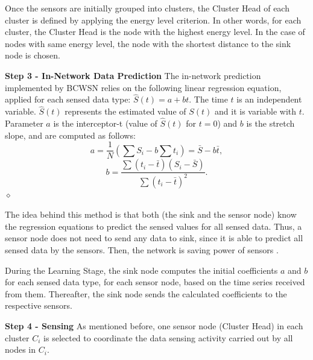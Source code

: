 \documentclass{acm_proc_article-sp}
\newcommand{\dia}{\hspace*{.1cm} \hfill $\diamond$}
\begin{document}
Once the sensors are initially grouped into clusters, the Cluster Head of each
cluster is defined by applying the energy level criterion.
In other words, for each cluster, the Cluster Head is the node with the highest
energy level. In the case of nodes with same energy level, the node with the
shortest distance to the sink node is chosen.
\vspace*{-.3cm}

{\bf Step 3 - In-Network Data Prediction}
The in-network prediction implemented by BCWSN relies on the
following linear regression equation, applied for each sensed data type:
$\hat{S}(t) = a + bt$.
The time $t$ is an independent variable. $\hat{S}(t)$ represents the estimated
value of $S(t)$ and it is variable with $t$. Parameter $a$ is the interceptor-t
(value of $\hat{S}(t)$ for $t=0$) and $b$ is the stretch slope, and are computed
as follows:
\begin{equation}
\label{coef-a}
	a = \frac{1}{N}\left(\sum S_{i} - b\sum t_{i} \right) = \bar{S} - b\bar{t},
\end{equation}
\vspace*{-.3cm}
\begin{equation}
\label{coef-b}
	b = \frac{\sum \left(t_{i} - \bar{t}\right)\left(S_{i} - \bar{S}\right)}{\sum \left(t_{i} - \bar{t}\right)^{2}}.
\end{equation}
	\dia
\vspace*{-.4cm}

The idea behind this method is that both (the sink and the sensor node) know the
regression equations to predict the sensed values for all sensed data. Thus, a
sensor node does not need to send any data to sink, since it is able to predict
all sensed data by the sensors. Then, the network is saving power of sensors
\cite{MaiaACR2013}.
\vspace*{-.3cm}

During the Learning Stage, the sink node computes the initial coefficients $a$
and $b$ for each sensed data type, for each sensor node, based on the time
series received from them. Thereafter, the sink node sends the calculated
coefficients to the respective sensors.
\vspace*{-.3cm}

{\bf Step 4 - Sensing}
As mentioned before, one sensor node (Cluster Head) in each cluster $C_{i}$ is
selected to coordinate the data sensing activity carried out by all nodes in
$C_{i}$.
\vspace*{-.3cm}
\end{document}
